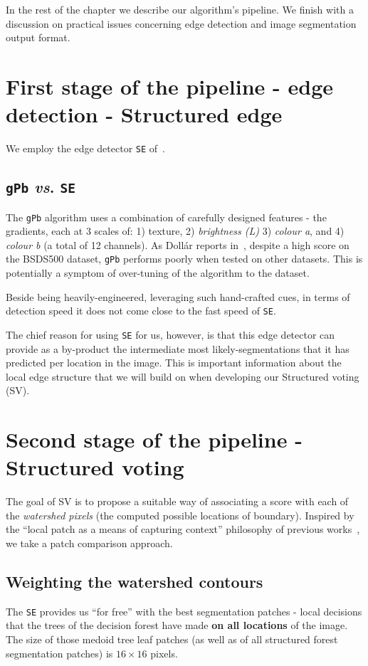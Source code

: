 In the rest of the chapter we describe our algorithm's pipeline. We finish with a discussion on practical issues concerning edge detection and image segmentation output format.

\section[First stage of the pipeline - Structured edge]{First stage of the pipeline - edge detection - Structured edge}
We employ the edge detector {\tt SE} of~\cite{DollarICCV13edges,Dollar2015PAMI}.

\subsection{{\tt gPb} \emph{vs}. {\tt SE}}
The {\tt gPb} algorithm uses a combination of carefully designed features - the gradients, each at 3 scales of: 1) texture, 2) {\it brightness (L)} 3) {\it colour a}, and 4) {\it colour b} (a total of 12 channels). As Doll\'ar reports in~\cite{DollarICCV13edges}, despite a high score on the BSDS500 dataset, {\tt gPb} performs poorly when tested on other datasets. This is potentially a symptom of over-tuning of the algorithm to the dataset.

Beside being heavily-engineered, leveraging such hand-crafted cues, in terms of detection speed it does not come close to the fast speed %
of {\tt SE}.

The chief reason for using {\tt SE} for us, however, is that this edge detector can provide as a by-product the intermediate most likely-segmentations that it has predicted per location in the image. This is important information about the local edge structure that we will build on when developing our Structured voting (SV).

\section{Second stage of the pipeline - Structured voting}
\label{sec:ch4-SE-SV-UCM_SV_details}
The goal of SV is to propose a suitable way of associating a score with each of the {\it watershed pixels} (the computed possible locations of boundary). Inspired by the ``local patch as a means of capturing context'' philosophy of previous works~\cite{Dollar2006supervised,LimZD13,DollarICCV13edges}, we take a patch comparison approach.

\subsection{Weighting the watershed contours} %
The {\tt SE} provides us ``for free'' with the best segmentation patches - local decisions that the trees of the decision forest have made {\bf on all locations} of the image. The size of those medoid tree leaf patches (as well as of all structured forest segmentation patches) is $16\times 16$ pixels.

